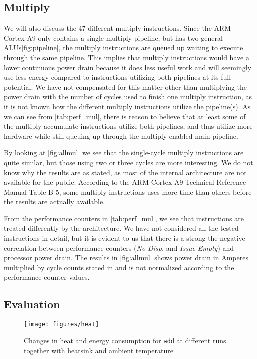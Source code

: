 \subsection{Multiply}
We will also discuss the 47 different multiply instructions. Since the ARM
Cortex-A9 only contains a single multiply pipeline, but has two general
ALUs\autoref{fig:pipeline}, the multiply instructions are queued up waiting to
execute through the same pipeline. This implies that multiply instructions would
have a lower continuous power drain because it does less useful work and will
seemingly use less energy compared to instructions utilizing both pipelines at
its full potential. We have not compensated for this matter other than
multiplying the power drain with the number of cycles used to finish one
multiply instruction, as it is not known how the different multiply instructions
utilize the pipeline(s). As we can see from \autoref{tab:perf_mul}, there is
reason to believe that at least some of the multiply-accumulate instructions
utilize both pipelines\cite{ramangcc}, and thus utilize more hardware while
still queuing up through the multiply-enabled main
pipeline.

By looking at \autoref{fig:allmul} we see that the single-cycle multiply
instructions are quite similar, but those using two or three cycles are more
interesting. We do not know why the results are as stated, as most of the
internal architecture are not available for the public. According to the ARM
Cortex-A9 Technical Reference Manual Table B-5, some multiply instructions uses
more time than others before the results are actually available\cite{armtech}.

From the performance counters in \autoref{tab:perf_mul}, we see that
instructions are treated differently by the architecture. We have not considered
all the tested instructions in detail, but it is evident to us that there is a
strong the negative correlation between performance counters (\emph{No Disp.}
and \emph{Issue Empty}) and processor power drain. The results in
\autoref{fig:allmul} shows power drain in Amperes multiplied by cycle counts
stated in \cite{armtech} and is not normalized according to the performance
counter values.

\subsection{Evaluation}
\begin{figure}
    \centering
    \texttt{[image: figures/heat]}
    \caption{Changes in heat and energy consumption for \texttt{add} at
    different runs together with heatsink and ambient temperature}
    \label{fig:heat}
\end{figure}

